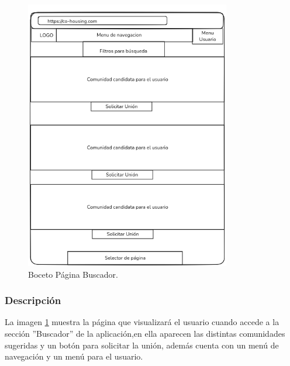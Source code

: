 \begin{figure}[H]
    \centering
    \includegraphics[width=0.8\textwidth]{fotos/buscador-basico.png}
    \caption{Boceto Página Buscador\textbf{}.}
    \label{fig:buscador-page}
\end{figure}
\subsubsection*{Descripción}
La imagen \ref{fig:buscador-page}  muestra la página que visualizará el usuario cuando accede a la sección ''Buscador'' de la aplicación,en ella aparecen las distintas comunidades sugeridas y un botón para solicitar la unión, además cuenta con un menú de navegación y un menú para el usuario.


